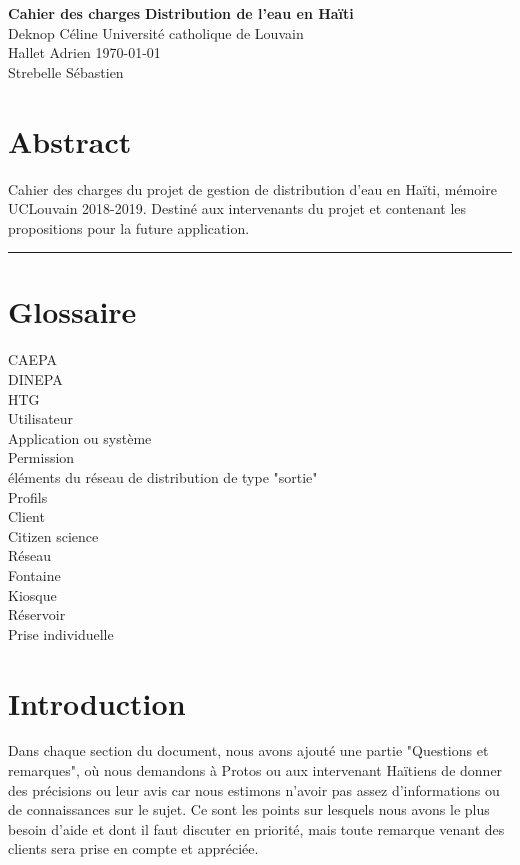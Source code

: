 \documentclass[a4paper, 11pt]{article}
\begin{document}
\noindent
\large\textbf{Cahier des charges} \hfill \textbf{Distribution de l'eau en Haïti} \\
\normalsize Deknop Céline \hfill Université catholique de Louvain \\
Hallet Adrien \hfill \today \\
Strebelle Sébastien

\section*{Abstract}
Cahier des charges du projet de gestion de distribution d'eau en Haïti, mémoire UCLouvain 2018-2019. Destiné aux intervenants du projet et contenant les propositions pour la future application.
\hrule
\section{Glossaire}
  \begin{description} %
    \item[CAEPA]
    \item[DINEPA]
    \item[HTG]
    \item[Utilisateur]
    \item[Application ou système]
    \item[Permission]
    \item[éléments du réseau de distribution de type "sortie"] %
    \item[Profils]
    \item[Client]
    \item[Citizen science]
    \item[Réseau]
    \item[Fontaine]
    \item[Kiosque]
    \item[Réservoir]
    \item[Prise individuelle]
  \end{description}
\section{Introduction}
Dans chaque section du document, nous avons ajouté une partie "Questions et remarques", où nous demandons à Protos ou aux intervenant Haïtiens de donner des précisions ou leur avis car nous estimons n'avoir pas assez d'informations ou de connaissances sur le sujet. Ce sont les points sur lesquels nous avons le plus besoin d'aide et dont il faut discuter en priorité, mais toute remarque venant des clients sera prise en compte et appréciée.
\end{document}

